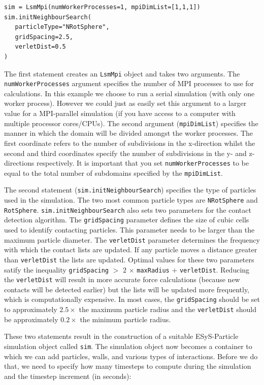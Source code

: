 \begin{verbatim} 
sim = LsmMpi(numWorkerProcesses=1, mpiDimList=[1,1,1])
sim.initNeighbourSearch(
   particleType="NRotSphere",
   gridSpacing=2.5,
   verletDist=0.5
)
\end{verbatim} 

The first statement creates an \texttt{LsmMpi} object and takes two arguments. The \texttt{numWorker\+Processes} argument specifies the number of MPI processes to use for calculations. In this example we choose to run a serial simulation (with only one worker process).  However we could just as easily set this argument to a larger value for a MPI-parallel simulation (if you have access to a computer with multiple processor cores/CPUs). The second argument (\texttt{mpiDimList}) specifies the manner in which the domain will be divided amongst the worker processes. The first coordinate refers to the number of subdivisions in the x-direction whilst the second and third coordinates specify the number of subdivisions in the y- and z-directions respectively. It is important that you set \texttt{numWorkerProcesses} to be equal to the total number of subdomains specified by the \texttt{mpiDimList}.

The second statement (\texttt{sim.initNeighbourSearch}) specifies the type of particles used in the simulation. The two most common particle types are \texttt{NRotSphere} and \texttt{RotSphere}. \texttt{sim.initNeighbourSearch} also sets two parameters for the contact detection algorithm. The \texttt{gridSpacing} parameter defines the size of cubic cells used to identify contacting particles. This parameter needs to be larger than the maximum particle diameter. The \texttt{verletDist} parameter determines the frequency with which the contact lists are updated. If any particle moves a distance greater than \texttt{verletDist} the lists are updated. Optimal values for these two parameters satify the inequality \texttt{gridSpacing} $>$ $2$ $\times$ \texttt{maxRadius} $+$ \texttt{verletDist}. Reducing the \texttt{verletDist} will result in more accurate force calculations (because new contacts will be detected earlier) but the lists will be updated more frequently, which is computationally expensive. In most 
cases, the \texttt{gridSpacing} should be set to approximately $2.5 \times$ the maximum particle radius and the \texttt{verletDist} should be approximately $0.2 \times$ the minimum particle radius.

These two statements result in the construction of a suitable ESyS-Particle simulation object called \texttt{sim}. The simulation object now becomes a container to which we can add particles, walls, and various types of interactions. Before we do that, we need to specify how many timesteps to compute during the simulation and the timestep increment (in seconds):

